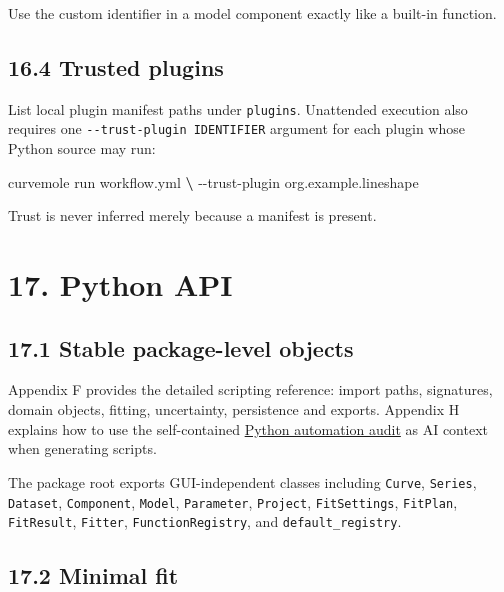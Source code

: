 \documentclass[
  10pt,
  a4paper,
  oneside]{scrreprt}
\newenvironment{Shaded}{}{}
\newcommand{\ExtensionTok}[1]{#1}
\newcommand{\KeywordTok}[1]{\textcolor[rgb]{0.00,0.44,0.13}{\textbf{#1}}}
\newcommand{\NormalTok}[1]{#1}
\begin{document}
Use the custom identifier in a model component exactly like a built-in
function.

\hypertarget{trusted-plugins}{%
\section{16.4 Trusted plugins}\label{trusted-plugins}}

List local plugin manifest paths under \texttt{plugins}. Unattended
execution also requires one \texttt{-\/-trust-plugin\ IDENTIFIER}
argument for each plugin whose Python source may run:

\begin{Shaded}
\begin{Highlighting}[]
\ExtensionTok{curvemole}\NormalTok{ run workflow.yml }\KeywordTok{\textbackslash{}}
  \ExtensionTok{{-}{-}trust{-}plugin}\NormalTok{ org.example.lineshape}
\end{Highlighting}
\end{Shaded}

Trust is never inferred merely because a manifest is present.

\hypertarget{python-api}{%
\chapter{17. Python API}\label{python-api}}

\hypertarget{stable-package-level-objects}{%
\section{17.1 Stable package-level
objects}\label{stable-package-level-objects}}

Appendix F provides the detailed scripting reference: import paths,
signatures, domain objects, fitting, uncertainty, persistence and
exports. Appendix H explains how to use the self-contained
\href{ai-python-audit.md}{Python automation audit} as AI context when
generating scripts.

The package root exports GUI-independent classes including
\texttt{Curve}, \texttt{Series}, \texttt{Dataset}, \texttt{Component},
\texttt{Model}, \texttt{Parameter}, \texttt{Project},
\texttt{FitSettings}, \texttt{FitPlan}, \texttt{FitResult},
\texttt{Fitter}, \texttt{FunctionRegistry}, and
\texttt{default\_registry}.

\hypertarget{minimal-fit}{%
\section{17.2 Minimal fit}\label{minimal-fit}}
\end{document}
